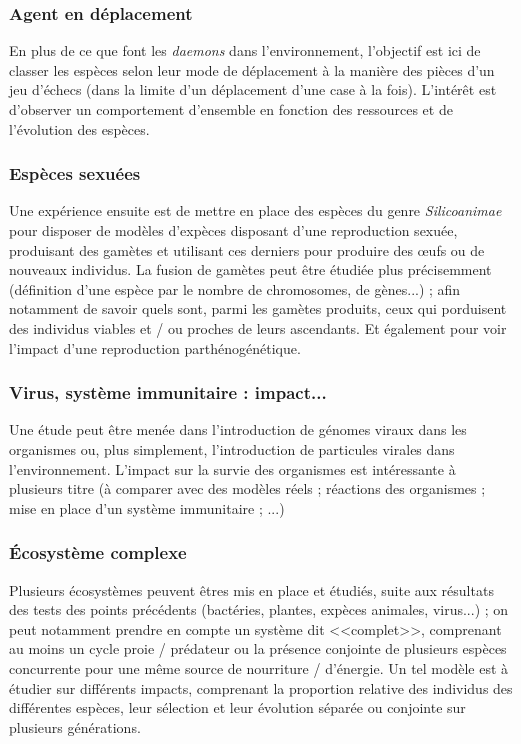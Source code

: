 \documentclass[11pt,twoside,a4paper]{article}
\begin{document}
\subsubsection{Agent en d{\'e}placement}

En plus de ce que font les \emph{daemons} dans l'environnement, l'objectif est ici de classer les esp{\`e}ces selon leur mode de d{\'e}placement {\`a} la mani{\`e}re des pi{\`e}ces d'un jeu d'{\'e}checs (dans la limite d'un d{\'e}placement d'une case {\`a} la fois). L'int{\'e}r{\^e}t est d'observer un comportement d'ensemble en fonction des ressources et de l'{\'e}volution des esp{\`e}ces. 

\subsubsection{Esp{\`e}ces sexu{\'e}es}

Une exp{\'e}rience ensuite est de mettre en place des esp{\`e}ces du genre \emph{Silicoanimae} pour disposer de mod{\`e}les d'exp{\`e}ces disposant d'une reproduction sexu{\'e}e, produisant des gam{\`e}tes et utilisant ces derniers pour produire des \oe ufs ou de nouveaux individus. La fusion de gam{\`e}tes peut {\^e}tre {\'e}tudi{\'e}e plus pr{\'e}cisemment (d{\'e}finition d'une esp{\`e}ce par le nombre de chromosomes, de g{\`e}nes...) ; afin notamment de savoir quels sont, parmi les gam{\`e}tes produits, ceux qui porduisent des individus viables et / ou proches de leurs ascendants. Et {\'e}galement pour voir l'impact d'une reproduction parth{\'e}nog{\'e}n{\'e}tique. 

\subsubsection{Virus, syst{\`e}me immunitaire : impact...}

Une {\'e}tude peut {\^e}tre men{\'e}e dans l'introduction de g{\'e}nomes viraux dans les organismes ou, plus simplement, l'introduction de particules virales dans l'environnement. L'impact sur la survie des organismes est int{\'e}ressante {\`a} plusieurs titre ({\`a} comparer avec des mod{\`e}les r{\'e}els ; r{\'e}actions des organismes ; mise en place d'un syst{\`e}me immunitaire ; ...)

\subsubsection{{\'E}cosyst{\`e}me complexe}

Plusieurs {\'e}cosyst{\`e}mes peuvent {\^e}tres mis en place et {\'e}tudi{\'e}s, suite aux r{\'e}sultats des tests des points pr{\'e}c{\'e}dents (bact{\'e}ries, plantes, exp{\`e}ces animales, virus...) ; on peut notamment prendre en compte un syst{\`e}me dit <<complet>>, comprenant au moins un cycle proie / pr{\'e}dateur ou la pr{\'e}sence conjointe de plusieurs esp{\`e}ces concurrente pour une m{\^e}me source de nourriture / d'{\'e}nergie. Un tel mod{\`e}le est {\`a} {\'e}tudier sur diff{\'e}rents impacts, comprenant la proportion relative des individus des diff{\'e}rentes esp{\`e}ces, leur s{\'e}lection et leur {\'e}volution s{\'e}par{\'e}e ou conjointe sur plusieurs g{\'e}n{\'e}rations.~\\
\end{document}
